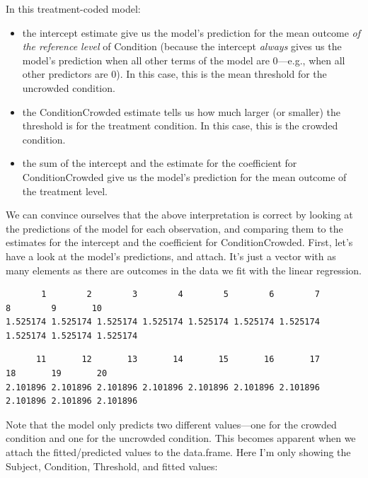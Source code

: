 \documentclass[
]{article}
\providecommand{\tightlist}{%
  \setlength{\itemsep}{0pt}\setlength{\parskip}{0pt}}
\begin{document}
\normalsize

In this treatment-coded model:

\begin{itemize}
\tightlist
\item
  the intercept estimate give us the model's prediction for the mean
  outcome \emph{of the reference level} of Condition (because the
  intercept \emph{always} gives us the model's prediction when all other
  terms of the model are 0---e.g., when all other predictors are 0). In
  this case, this is the mean threshold for the uncrowded condition.
\item
  the ConditionCrowded estimate tells us how much larger (or smaller)
  the threshold is for the treatment condition. In this case, this is
  the crowded condition.
\item
  the sum of the intercept and the estimate for the coefficient for
  ConditionCrowded give us the model's prediction for the mean outcome
  of the treatment level.
\end{itemize}

We can convince ourselves that the above interpretation is correct by
looking at the predictions of the model for each observation, and
comparing them to the estimates for the intercept and the coefficient
for ConditionCrowded. First, let's have a look at the model's
predictions, and attach. It's just a vector with as many elements as
there are outcomes in the data we fit with the linear regression.

\footnotesize

\begin{verbatim}
       1        2        3        4        5        6        7        8        9       10 
1.525174 1.525174 1.525174 1.525174 1.525174 1.525174 1.525174 1.525174 1.525174 1.525174 
\end{verbatim}

\begin{verbatim}
      11       12       13       14       15       16       17       18       19       20 
2.101896 2.101896 2.101896 2.101896 2.101896 2.101896 2.101896 2.101896 2.101896 2.101896 
\end{verbatim}

\normalsize

Note that the model only predicts two different values---one for the
crowded condition and one for the uncrowded condition. This becomes
apparent when we attach the fitted/predicted values to the data.frame.
Here I'm only showing the Subject, Condition, Threshold, and fitted
values:
\end{document}
